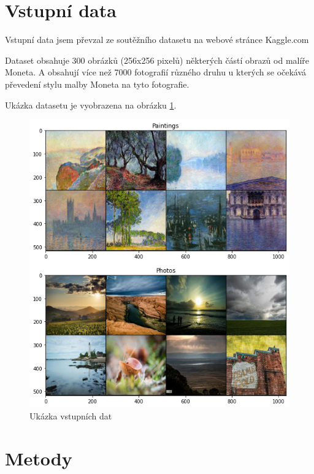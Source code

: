 \documentclass[czech]{mvi-report}
\begin{document}
\section{Vstupní data}

Vstupní data jsem převzal ze soutěžního datasetu na webové stránce Kaggle.com

Dataset obsahuje 300 obrázků (256x256 pixelů) některých částí obrazů od malíře Moneta. A obsahují více než 7000 fotografií různého druhu u kterých se očekává převedení stylu malby Moneta na tyto fotografie.

Ukázka datasetu je vyobrazena na obrázku \ref{fig:input-data}.

\begin{figure}[h]
  \centering\leavevmode
  \includegraphics[width=1\linewidth]{img/paintings_photos}\vskip-0.5cm
  \caption{Ukázka vstupních dat}
  \label{fig:input-data}
\end{figure}

\section{Metody}
\end{document}
